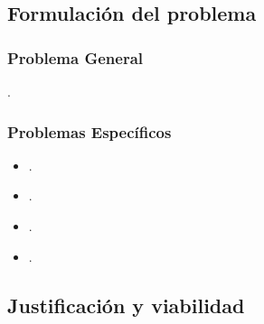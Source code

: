 \documentclass[12pt,a4paper]{article}
\begin{document}




























\subsection{Formulación del problema}
\subsubsection{Problema General}
\problema.
\subsubsection{Problemas Específicos}
\begin{itemize}
	\item \problemae.
	\item \problemaee.
	\item \problemaeee.
	\item \problemaeeee.
\end{itemize}


\subsection{Justificación y viabilidad}
\end{document}
